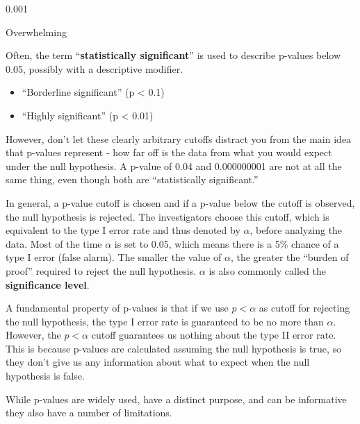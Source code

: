 \documentclass[
]{book}
\providecommand{\tightlist}{%
  \setlength{\itemsep}{0pt}\setlength{\parskip}{0pt}}
\theoremstyle{definition}
\theoremstyle{definition}
\theoremstyle{definition}
\theoremstyle{remark}
\begin{document}
0.001

Overwhelming

Often, the term ``\textbf{statistically significant}'' is used to describe p-values below 0.05, possibly with a descriptive modifier.

\begin{itemize}
\tightlist
\item
  ``Borderline significant'' (p \textless{} 0.1)\\
\item
  ``Highly significant'' (p \textless{} 0.01)
\end{itemize}

However, don't let these clearly arbitrary cutoffs distract you from the main idea that p-values represent - how far off is the data from what you would expect under the null hypothesis. A p-value of 0.04 and 0.000000001 are not at all the same thing, even though both are ``statistically significant.''

In general, a p-value cutoff is chosen and if a p-value below the cutoff is observed, the null hypothesis is rejected. The investigators choose this cutoff, which is equivalent to the type I error rate and thus denoted by \(\alpha\), before analyzing the data. Most of the time \(\alpha\) is set to 0.05, which means there is a 5\% chance of a type I error (false alarm). The smaller the value of \(\alpha\), the greater the ``burden of proof'' required to reject the null hypothesis. \(\alpha\) is also commonly called the \textbf{significance level}.

A fundamental property of p-values is that if we use \(p < \alpha\) as cutoff for rejecting the null hypothesis, the type I error rate is guaranteed to be no more than \(\alpha\). However, the \(p < \alpha\) cutoff guarantees us nothing about the type II error rate. This is because p-values are calculated assuming the null hypothesis is true, so they don't give us any information about what to expect when the null hypothesis is false.

While p-values are widely used, have a distinct purpose, and can be informative they also have a number of limitations.
\end{document}
